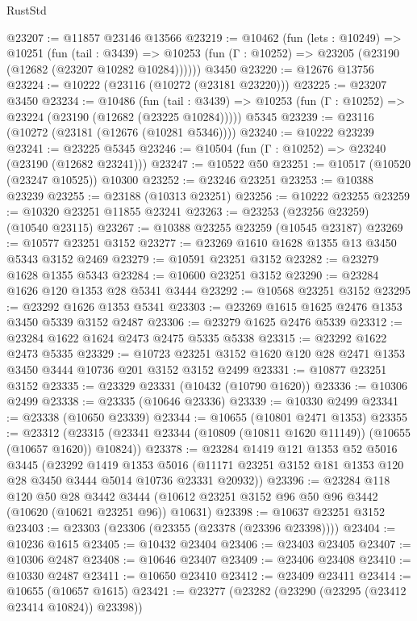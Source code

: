 \begin{lexlean}{RustStd}
\begin{coremodule}
@23207 := @11857 @23146 @13566
@23219 := @10462
    (fun (lets : @10249) =>
    @10251
      (fun (tail : @3439) =>
      @10253 (fun (Γ : @10252) => @23205 (@23190 (@12682 (@23207 @10282 @10284))))))
    @3450
@23220 := @12676 @13756
@23224 := @10222 (@23116 (@10272 (@23181 @23220)))
@23225 := @23207 @3450
@23234 := @10486
    (fun (tail : @3439) => @10253 (fun (Γ : @10252) => @23224 (@23190 (@12682 (@23225 @10284)))))
    @5345
@23239 := @23116 (@10272 (@23181 (@12676 (@10281 @5346))))
@23240 := @10222 @23239
@23241 := @23225 @5345
@23246 := @10504 (fun (Γ : @10252) => @23240 (@23190 (@12682 @23241)))
@23247 := @10522 @50
@23251 := @10517 (@10520 (@23247 @10525)) @10300
@23252 := @23246 @23251
@23253 := @10388 @23239
@23255 := @23188 (@10313 @23251)
@23256 := @10222 @23255
@23259 := @10320 @23251 @11855 @23241
@23263 := @23253 (@23256 @23259) (@10540 @23115)
@23267 := @10388 @23255 @23259 (@10545 @23187)
@23269 := @10577 @23251 @3152
@23277 := @23269 @1610 @1628 @1355 @13 @3450 @5343 @3152 @2469
@23279 := @10591 @23251 @3152
@23282 := @23279 @1628 @1355 @5343
@23284 := @10600 @23251 @3152
@23290 := @23284 @1626 @120 @1353 @28 @5341 @3444
@23292 := @10568 @23251 @3152
@23295 := @23292 @1626 @1353 @5341
@23303 := @23269 @1615 @1625 @2476 @1353 @3450 @5339 @3152 @2487
@23306 := @23279 @1625 @2476 @5339
@23312 := @23284 @1622 @1624 @2473 @2475 @5335 @5338
@23315 := @23292 @1622 @2473 @5335
@23329 := @10723 @23251 @3152 @1620 @120 @28 @2471 @1353 @3450 @3444 @10736 @201 @3152 @3152 @2499
@23331 := @10877 @23251 @3152
@23335 := @23329 @23331 (@10432 (@10790 @1620))
@23336 := @10306 @2499
@23338 := @23335 (@10646 @23336)
@23339 := @10330 @2499
@23341 := @23338 (@10650 @23339)
@23344 := @10655 (@10801 @2471 @1353)
@23355 := @23312
    (@23315 (@23341 @23344 (@10809 (@10811 @1620 @11149)) (@10655 (@10657 @1620)) @10824))
@23378 := @23284
    @1419
    @121
    @1353
    @52
    @5016
    @3445
    (@23292
      @1419
      @1353
      @5016
      (@11171 @23251 @3152 @181 @1353 @120 @28 @3450 @3444 @5014 @10736 @23331 @20932))
@23396 := @23284
    @118
    @120
    @50
    @28
    @3442
    @3444
    (@10612 @23251 @3152 @96 @50 @96 @3442 (@10620 (@10621 @23251 @96)) @10631)
@23398 := @10637 @23251 @3152
@23403 := @23303 (@23306 (@23355 (@23378 (@23396 @23398))))
@23404 := @10236 @1615
@23405 := @10432 @23404
@23406 := @23403 @23405
@23407 := @10306 @2487
@23408 := @10646 @23407
@23409 := @23406 @23408
@23410 := @10330 @2487
@23411 := @10650 @23410
@23412 := @23409 @23411
@23414 := @10655 (@10657 @1615)
@23421 := @23277 (@23282 (@23290 (@23295 (@23412 @23414 @10824)) @23398))

\end{coremodule}
\end{lexlean}

